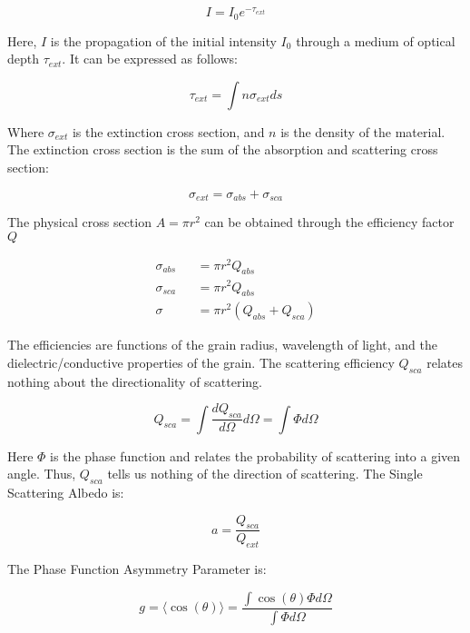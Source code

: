 \documentclass[oneside]{book}
\theoremstyle{definition}
\numberwithin{equation}{section}
\begin{document}
\begin{equation}
I = I_0 e^{-\tau_{ext}}
\end{equation}

Here, $I$ is the propagation of the initial intensity $I_0$ through a medium of optical depth $\tau_{ext}$. It can be expressed as follows:

\begin{equation}
\tau_{ext} = \int n \sigma_{ext} ds
\end{equation}

Where $\sigma_{ext}$ is the extinction cross section, and $n$ is the density of the material. The extinction cross section is the sum of the absorption and scattering cross section:

\begin{equation}
\sigma_{ext} = \sigma_{abs}+\sigma_{sca}
\end{equation}

The physical cross section $A= \pi r^2$ can be obtained through the efficiency factor $Q$

\begin{eqnarray}
\sigma_{abs} &&= \pi r^2 Q_{abs} \\
\sigma_{sca} &&= \pi r^2 Q_{abs} \\
\sigma  &&= \pi r^2(Q_{abs}+Q_{sca})
\end{eqnarray}

The efficiencies are functions of the grain radius, wavelength of light, and the dielectric/conductive properties of the grain. The scattering efficiency $Q_{sca}$ relates nothing about the directionality of scattering.

\begin{equation}
Q_{sca} = \int \frac{d Q_{sca}}{d\Omega} d\Omega = \int \Phi d\Omega
\end{equation}

Here $\Phi$ is the phase function and relates the probability of scattering into a given angle. Thus, $Q_{sca}$ tells us nothing of the direction of scattering. The Single Scattering Albedo is:

\begin{equation}
a = \frac{Q_{sca}}{Q_{ext}}
\end{equation}

The Phase Function Asymmetry Parameter is:

\begin{equation}
g = \langle \cos(\theta) \rangle = \frac{\int \cos(\theta)\Phi d\Omega}{\int \Phi d\Omega}
\end{equation}
\end{document}

